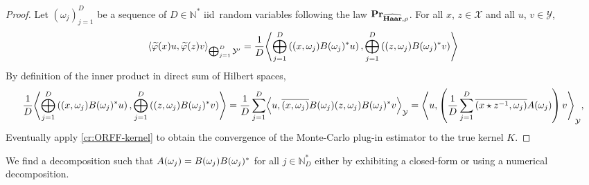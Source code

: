 \begin{proof}
    Let $(\omega_j)_{j=1}^D$ be a sequence of $D\in\mathbb{N}^*$
    \ac{iid}~random variables following the law
    ${\mathbf{{Pr}}}_{\widehat{\mathbf{Haar}},\rho}$. For all $x$, $z \in \mathcal{X}$ and
    all $u$, $v \in \mathcal{Y}$,
    \begin{dmath*}
        \inner*{\tildePhi{\omega}(x)u,\tildePhi{\omega}(z)v}_{\Vect_{j=1}^D
        \mathcal{Y}'}
        =\frac{1}{D}\inner*{\Vect_{j=1}^D \left(\pairing{x,
        \omega_j}B(\omega_j)^\adjoint u\right), \Vect_{j=1}^D\left(\pairing{z,
        \omega_j}B(\omega_j)^\adjoint v\right)}
    \end{dmath*}
    By definition of the inner product in direct sum of Hilbert spaces, 
    \begin{dmath*}
        \frac{1}{D}\inner*{\Vect_{j=1}^D \left(\pairing{x,
        \omega_j}B(\omega_j)^\adjoint u\right), \Vect_{j=1}^D\left(\pairing{z,
        \omega_j}B(\omega_j)^\adjoint v\right)} 
        = \frac{1}{D} \sum_{j=1}^D \inner*{u, \conj{\pairing{x,
        \omega_j}}B(\omega_j)\pairing{z, \omega_j}B(\omega_j)^\adjoint
        v}_{\mathcal{Y}}
        = \inner*{u, \left(\frac{1}{D} \sum_{j=1}^D \conj{\pairing{x\groupop
        \inv{z}, \omega_j}}A(\omega_j)\right)v}_{\mathcal{Y}},
    \end{dmath*}
    Eventually apply \cref{cr:ORFF-kernel} to obtain the convergence of the
    Monte-Carlo plug-in estimator to the true kernel $K$.
\end{proof}
\begin{remark}
    We find a decomposition such that
    $A(\omega_j)=B(\omega_j)B(\omega_j)^* $ for all $j\in\mathbb{N}^*_D$
    either by exhibiting a closed-form or using a numerical decomposition.
\end{remark}


